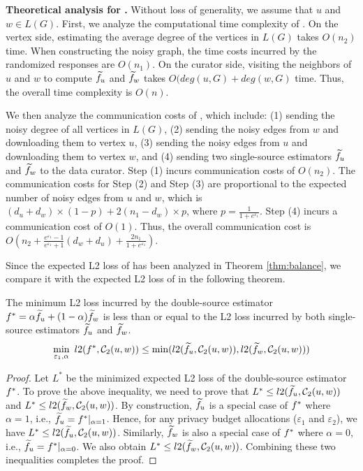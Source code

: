 {
\noindent
{\bf Theoretical analysis for \advds.} 
Without loss of generality, we assume that $u$ and $w \in L(G)$. 
First, we analyze the computational time complexity of \advds. 
On the vertex side, estimating the average degree of the vertices in $L(G)$ takes $O(n_2)$ time. 
When constructing the noisy graph, the time costs incurred by the randomized responses are $O(n_1)$. 
On the curator side, visiting the neighbors of $u$ and $w$ to compute $\widetilde{f}_u$ and $\widetilde{f}_w$ takes $O(deg(u, G)  + deg(w, G) $ time. 
Thus, the overall time complexity is $O(n)$.}

{We then analyze the communication costs of \advds, which include: 
    (1) sending the noisy degree of all vertices in $L(G)$,
    (2) sending the noisy edges from $w$ and downloading them to vertex $u$,
    (3) sending the noisy edges from $u$ and downloading them to vertex $w$, and
    (4) sending two single-source estimators $\widetilde{f}_u$ and $\widetilde{f}_w$ to the data curator. 
Step (1) incurs communication costs of $O(n_2)$. 
The communication costs for Step (2) and Step (3) are proportional to the expected number of noisy edges from $u$ and $w$, which is $(d_u + d_w) \times (1-p) + 2(n_1 - d_w) \times p$, where $p = \frac{1}{1 + e^{\varepsilon_1}}$. 
Step (4) incurs a communication cost of $O(1)$. 
Thus, the overall communication cost is $O(n_2 + \frac{e^{\varepsilon_1}-1}{e^{\varepsilon_1}+1} (d_w+d_u) + \frac{ 2 n_1}{1 + e^{\varepsilon_1}})$. 
}

{
Since the expected L2 loss of \advds has been analyzed in Theorem \ref{thm:balance}, we compare it with the expected L2 loss of \advss in the following theorem. 
\begin{theorem}
\label{thm:compare}
The minimum L2 loss incurred by the double-source estimator $f^*= \alpha \widetilde{f}_u + (1 - \alpha) \widetilde{f}_w$ is less than or equal to the L2 loss incurred by both single-source estimators $\widetilde{f}_u$ and $\widetilde{f}_w$. 
$$
\min_{\varepsilon_1, \alpha} \ l2(f^*, \mathcal{C}_2(u,w)) \leq \min(l2(\widetilde{f}_u, \mathcal{C}_2(u,w)), l2(\widetilde{f}_w, \mathcal{C}_2(u,w)))
$$
\end{theorem}
\begin{proof}
    Let $L^*$ be the minimized expected L2 loss of the double-source estimator $f^*$. 
    To prove the above inequality, we need to prove that $L^* \leq l2(\widetilde{f}_u, \mathcal{C}_2(u,w))$ and $L^* \leq l2(\widetilde{f}_w, \mathcal{C}_2(u,w))$. 
    By construction, $\widetilde{f}_u$ is a special case of $f^*$ where $\alpha =1$, i.e., $\widetilde{f}_u = f^* |_{\alpha =1}$. 
    Hence, for any privacy budget allocations ($\varepsilon_1$ and $\varepsilon_2$), we have $L^* \leq l2(\widetilde{f}_u, \mathcal{C}_2(u,w))$. 
    Similarly, $\widetilde{f}_w$ is also a special case of $f^*$ where $\alpha =0$, i.e., $\widetilde{f}_u = f^* |_{\alpha =0}$. 
    We also obtain $L^* \leq l2(\widetilde{f}_w, \mathcal{C}_2(u,w))$. 
    Combining these two inequalities completes the proof. 
\end{proof}
}

